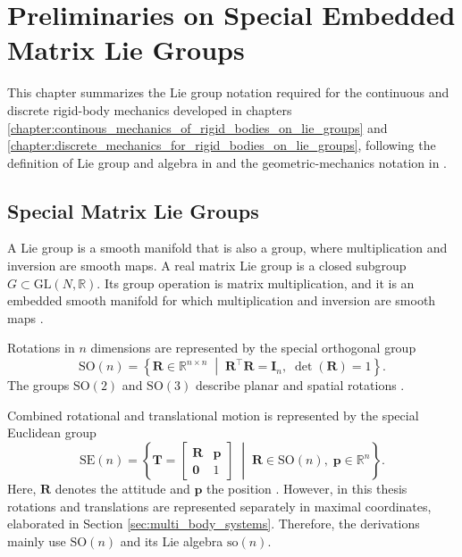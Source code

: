 \chapter{Preliminaries on Special Embedded Matrix Lie Groups}
\label{chap:preliminaries_lie_groups}

This chapter summarizes the Lie group notation required for the continuous and discrete rigid-body mechanics developed in chapters \ref{chapter:continous_mechanics_of_rigid_bodies_on_lie_groups} and \ref{chapter:discrete_mechanics_for_rigid_bodies_on_lie_groups}, following the definition of Lie group and algebra in \cite{Hall2000LieGroups} and the geometric-mechanics notation in \cite{Lee2008}.

\section{Special Matrix Lie Groups}
\label{sec:special_matrix_lie_groups}

A Lie group is a smooth manifold that is also a group, where multiplication and inversion are smooth maps. A real matrix Lie group is a closed subgroup
$G\subset\mathrm{GL}(N,\mathbb{R})$. Its group operation is matrix
multiplication, and it is an embedded smooth manifold for which
multiplication and inversion are smooth maps
\cite{Hall2000LieGroups}.

Rotations in \(n\) dimensions are represented by the special orthogonal group
\begin{equation}
    \mathrm{SO}(n)
    =
    \left\{
        \bm{R}\in\mathbb{R}^{n\times n}
        \;\middle|\;
        \bm{R}^{\top}\bm{R}=\bm{I}_{n},\;
        \det(\bm{R})=1
    \right\}.
    \label{eq:so_group}
\end{equation}
The groups \(\mathrm{SO}(2)\) and \(\mathrm{SO}(3)\) describe planar and spatial rotations \cite{Lee2008}.

Combined rotational and translational motion is represented by the special Euclidean group
\begin{equation}
    \mathrm{SE}(n)
    =
    \left\{
        \bm{T}
        =
        \begin{bmatrix}
            \bm{R} & \bm{p}\\
            \bm{0} & 1
        \end{bmatrix}
        \;\middle|\;
        \bm{R}\in\mathrm{SO}(n),\;
        \bm{p}\in\mathbb{R}^{n}
    \right\}.
    \label{eq:se_group}
\end{equation}
Here, \(\bm{R}\) denotes the attitude and \(\bm{p}\) the position \cite{Hall2000LieGroups}. However, in this thesis 
rotations and translations are represented separately
in maximal coordinates, elaborated in Section \ref{sec:multi_body_systems}. Therefore, the derivations mainly use
$\mathrm{SO}(n)$ and its Lie algebra $\mathrm{so}(n)$.

